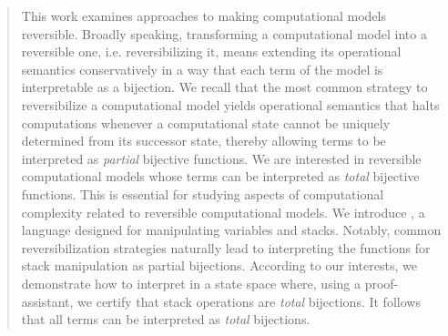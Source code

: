 \begin{abstract}
This work examines approaches to making computational models reversible. Broadly speaking, transforming a computational model into a reversible one, i.e. reversibilizing it, means extending its operational semantics conservatively in a way that each term of the model is interpretable as a bijection. 
We recall that the most common strategy to reversibilize a computational model yields operational semantics that halts computations whenever a computational state cannot be uniquely determined from its successor state, thereby allowing terms to be interpreted as \emph{partial} bijective functions.
We are interested in reversible computational models whose terms can be interpreted as \emph{total} bijective functions. This is essential for studying aspects of computational complexity related to reversible computational models.
We introduce \SCORE, a language designed for manipulating variables and stacks. 
Notably, common reversibilization strategies naturally lead to interpreting the functions for stack manipulation as partial bijections.
According to our interests, we demonstrate how to interpret \SCORE in a state space where, using a proof-assistant, we certify that stack operations are \emph{total} bijections. It follows that all \SCORE terms can be interpreted as \emph{total} bijections.
\end{abstract}